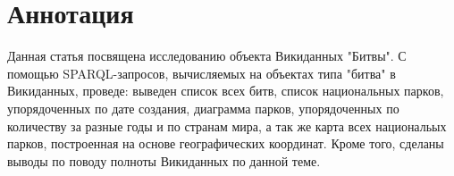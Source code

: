 \section{Аннотация}

Данная статья посвящена исследованию объекта Викиданных "Битвы". С помощью SPARQL-запросов, вычисляемых на объектах типа "битва" в Викиданных, проведе: выведен список всех битв, список национальных парков, упорядоченных по дате создания, диаграмма парков, упорядоченных по количеству за разные годы и по странам мира, а так же карта всех национальых парков, построенная на основе географических координат. Кроме того, сделаны выводы по поводу полноты Викиданных по данной теме.